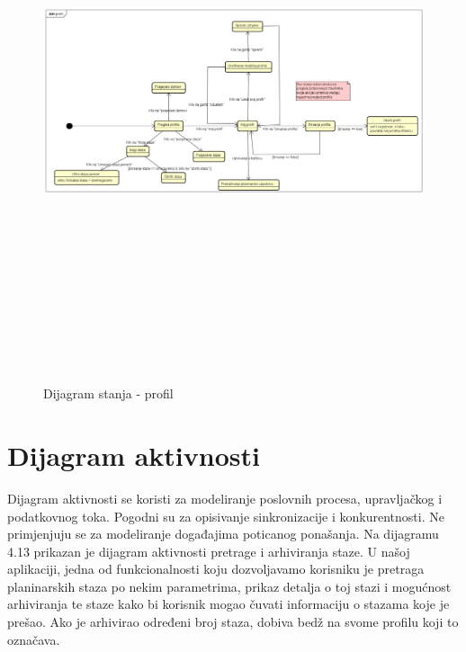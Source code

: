 			\begin{figure}[H]
				\includegraphics[width=160mm, height=165mm]{dijagrami/sd-autentikacija/profil.png} %
				\centering
				\caption{Dijagram stanja - profil}
				\label{fig:dijagrami_stanja4}
			\end{figure}
			
			\eject 
			

		
		\section{Dijagram aktivnosti}
			
			 Dijagram aktivnosti se koristi za modeliranje poslovnih procesa, upravljačkog i podatkovnog toka. Pogodni su za opisivanje sinkronizacije i konkurentnosti. Ne primjenjuju se za modeliranje događajima poticanog ponašanja. Na dijagramu 4.13 prikazan je dijagram aktivnosti pretrage i arhiviranja staze. U našoj aplikaciji, jedna od funkcionalnosti koju dozvoljavamo korisniku je pretraga planinarskih staza po nekim parametrima, prikaz detalja o toj stazi i mogućnost arhiviranja te staze kako bi korisnik mogao čuvati informaciju o stazama koje je prešao. Ako je arhivirao određeni broj staza, dobiva bedž na svome profilu koji to označava.
			 
